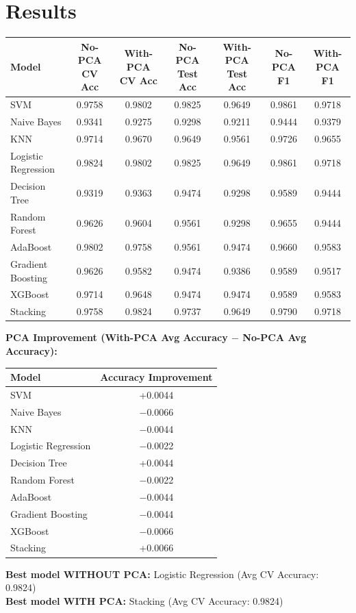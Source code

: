 \documentclass[12pt,a4paper]{article}
\begin{document}
\section{Results}
\begin{longtable}{lcccccc}
\toprule
Model & No-PCA CV Acc & With-PCA CV Acc & No-PCA Test Acc & With-PCA Test Acc & No-PCA F1 & With-PCA F1\\
\midrule
SVM & 0.9758 & 0.9802 & 0.9825 & 0.9649 & 0.9861 & 0.9718\\
Naive Bayes & 0.9341 & 0.9275 & 0.9298 & 0.9211 & 0.9444 & 0.9379\\
KNN & 0.9714 & 0.9670 & 0.9649 & 0.9561 & 0.9726 & 0.9655\\
Logistic Regression & 0.9824 & 0.9802 & 0.9825 & 0.9649 & 0.9861 & 0.9718\\
Decision Tree & 0.9319 & 0.9363 & 0.9474 & 0.9298 & 0.9589 & 0.9444\\
Random Forest & 0.9626 & 0.9604 & 0.9561 & 0.9298 & 0.9655 & 0.9444\\
AdaBoost & 0.9802 & 0.9758 & 0.9561 & 0.9474 & 0.9660 & 0.9583\\
Gradient Boosting & 0.9626 & 0.9582 & 0.9474 & 0.9386 & 0.9589 & 0.9517\\
XGBoost & 0.9714 & 0.9648 & 0.9474 & 0.9474 & 0.9589 & 0.9583\\
Stacking & 0.9758 & 0.9824 & 0.9737 & 0.9649 & 0.9790 & 0.9718\\
\bottomrule
\end{longtable}

\textbf{PCA Improvement (With-PCA Avg Accuracy $-$ No-PCA Avg Accuracy):}
\begin{longtable}{lc}
\toprule
Model & Accuracy Improvement\\
\midrule
SVM & +0.0044\\
Naive Bayes & $-$0.0066\\
KNN & $-$0.0044\\
Logistic Regression & $-$0.0022\\
Decision Tree & +0.0044\\
Random Forest & $-$0.0022\\
AdaBoost & $-$0.0044\\
Gradient Boosting & $-$0.0044\\
XGBoost & $-$0.0066\\
Stacking & +0.0066\\
\bottomrule
\end{longtable}

\noindent \textbf{Best model WITHOUT PCA:} Logistic Regression (Avg CV Accuracy: 0.9824)\\
\textbf{Best model WITH PCA:} Stacking (Avg CV Accuracy: 0.9824)
\end{document}
